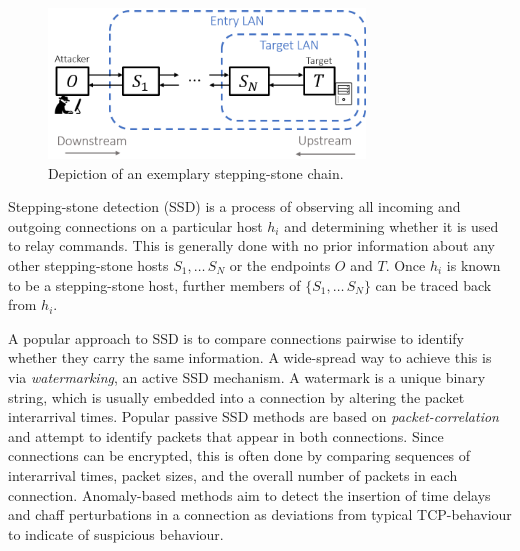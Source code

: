 \documentclass[runningheads,11pt]{llncs}\usepackage[]{graphicx}\usepackage[]{color}
\begin{document}
\begin{figure}
\centering
\includegraphics[width=0.75\textwidth]{images/Stepstone_final.png}
\caption{Depiction of an exemplary stepping-stone chain.}\label{Fig:Stepstone}
\end{figure}


Stepping-stone detection (SSD) is a process of observing all incoming and outgoing connections on a particular host $h_i$ and determining whether it is used to relay commands. This is generally done with no prior information about any other stepping-stone hosts $S_1,\dots\,S_N$ or the endpoints $O$ and $T$. Once $h_i$ is known to be a stepping-stone host, further members of $\{S_1,\dots\,S_N\}$ can be traced back from $h_i$.   %

A popular approach to SSD is to compare connections pairwise to identify whether they carry the same information. A wide-spread way to achieve this is via \textit{watermarking}, an active SSD mechanism. A watermark is a unique binary string, which is usually embedded into a connection by altering the packet interarrival times. %
Popular passive SSD methods are based on \textit{packet-correlation} and attempt to identify packets that appear in both connections. Since connections can be encrypted, this is often done by comparing sequences of interarrival times, packet sizes, and the overall number of packets in each connection.
Anomaly-based methods aim to detect the insertion of time delays and chaff perturbations in a connection as deviations from typical TCP-behaviour to indicate of suspicious behaviour. 
\end{document}
